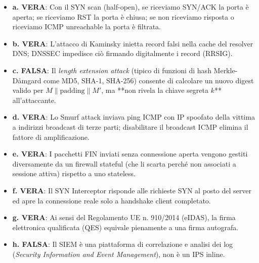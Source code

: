 \documentclass[11pt,a4paper]{article}
\begin{document}
\begin{solutionbox}
\begin{itemize}
    \item \textbf{a. VERA}: Con il SYN scan (half-open), se riceviamo SYN/ACK la porta \`e aperta; se riceviamo RST la porta \`e chiusa; se non riceviamo risposta o riceviamo ICMP unreachable la porta \`e filtrata.
    \item \textbf{b. VERA}: L'attacco di Kaminsky inietta record falsi nella cache del resolver DNS; DNSSEC impedisce ci\`o firmando digitalmente i record (RRSIG).
    \item \textbf{c. FALSA}: Il \textit{length extension attack} (tipico di funzioni di hash Merkle-D\r{a}mgard come MD5, SHA-1, SHA-256) consente di calcolare un nuovo digest valido per $M \parallel \text{padding} \parallel M'$, ma **non rivela la chiave segreta $k$** all'attaccante.
    \item \textbf{d. VERA}: Lo Smurf attack inviava ping ICMP con IP spoofato della vittima a indirizzi broadcast di terze parti; disabilitare il broadcast ICMP elimina il fattore di amplificazione.
    \item \textbf{e. VERA}: I pacchetti FIN inviati senza connessione aperta vengono gestiti diversamente da un firewall stateful (che li scarta perch\'e non associati a sessione attiva) rispetto a uno stateless.
    \item \textbf{f. VERA}: Il SYN Interceptor risponde alle richieste SYN al posto del server ed apre la connessione reale solo a handshake client completato.
    \item \textbf{g. VERA}: Ai sensi del Regolamento UE n. 910/2014 (eIDAS), la firma elettronica qualificata (QES) equivale pienamente a una firma autografa.
    \item \textbf{h. FALSA}: Il SIEM \`e una piattaforma di correlazione e analisi dei log (\textit{Security Information and Event Management}), non \`e un IPS inline.
\end{itemize}
\end{solutionbox}
\end{document}
